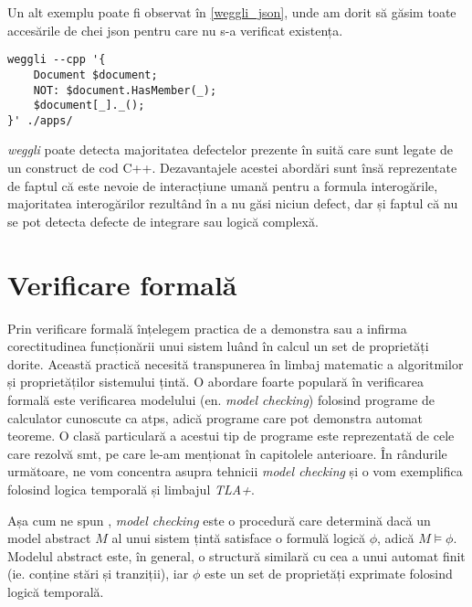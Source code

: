 Un alt exemplu poate fi observat în \ref{weggli_json}, unde am dorit să găsim toate accesările de chei \acrshort{json} pentru care nu s-a verificat existența.

\begin{lstlisting}[label={weggli_json}, caption={Interogare weggli pentru a găsi accesarea de chei JSON fără verificare}]
weggli --cpp '{ 
    Document $document;
    NOT: $document.HasMember(_);
    $document[_]._();
}' ./apps/
\end{lstlisting}

\textit{weggli} poate detecta majoritatea defectelor prezente în suită care sunt legate de un construct de cod C++. Dezavantajele acestei abordări sunt însă reprezentate de faptul că este nevoie de interacțiune umană pentru a formula interogările, majoritatea interogărilor rezultând în a nu găsi niciun defect, dar și faptul că nu se pot detecta defecte de integrare sau logică complexă.



\section{Verificare formală}

Prin verificare formală înțelegem practica de a demonstra sau a infirma corectitudinea funcționării unui sistem luând în calcul un set de proprietăți dorite. Această practică necesită transpunerea în limbaj matematic a algoritmilor și proprietăților sistemului țintă. O abordare foarte populară în verificarea formală este verificarea modelului (en. \textit{model checking}) folosind programe de calculator cunoscute ca \acrfull{atps}, adică programe care pot demonstra automat teoreme. O clasă particulară a acestui tip de programe este reprezentată de cele care rezolvă \acrfull{smt}, pe care le-am menționat în capitolele anterioare. În rândurile următoare, ne vom concentra asupra tehnicii \textit{model checking} și o vom exemplifica folosind logica temporală și limbajul \textit{TLA+}.

Așa cum ne spun \citet{Markus1999}, \textit{model checking} este o procedură care determină dacă un model abstract $M$ al unui sistem țintă satisface o formulă logică $\phi$, adică $M \models \phi$. Modelul abstract este, în general, o structură similară cu cea a unui automat finit (ie. conține stări și tranziții), iar $\phi$ este un set de proprietăți exprimate folosind logică temporală.

